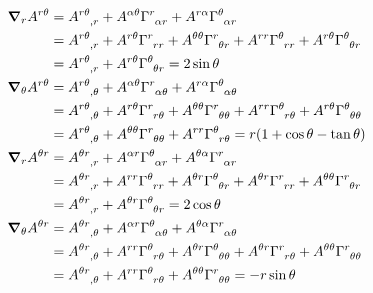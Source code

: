 \documentclass[gr-notes.tex]{subfiles}
\begin{document}
\begin{align*}
  \grad_r A^{r \theta} &=
  \tensor{A}{^{r \theta}_{,r}} +
  A^{\alpha \theta} \tensor{\Gamma}{^r_{\alpha r}} +
  A^{r \alpha} \tensor{\Gamma}{^\theta_{\alpha r}}
  \\ &=
  \tensor{A}{^{r \theta}_{,r}} +
  A^{r \theta} \tensor{\Gamma}{^r_{r r}} +
  A^{\theta \theta} \tensor{\Gamma}{^r_{\theta r}} +
  A^{r r} \tensor{\Gamma}{^\theta_{r r}} +
  A^{r \theta} \tensor{\Gamma}{^\theta_{\theta r}}
  \\ &=
  \tensor{A}{^{r \theta}_{,r}} +
  A^{r \theta} \tensor{\Gamma}{^\theta_{\theta r}} =
  2 \sin\theta
  \\
  \grad_\theta A^{r \theta} &=
  \tensor{A}{^{r \theta}_{,\theta}} +
  A^{\alpha \theta} \tensor{\Gamma}{^r_{\alpha \theta}} +
  A^{r \alpha} \tensor{\Gamma}{^\theta_{\alpha \theta}}
  \\ &=
  \tensor{A}{^{r \theta}_{,\theta}} +
  A^{r \theta} \tensor{\Gamma}{^r_{r \theta}} +
  A^{\theta \theta} \tensor{\Gamma}{^r_{\theta \theta}} +
  A^{r r} \tensor{\Gamma}{^\theta_{r \theta}} +
  A^{r \theta} \tensor{\Gamma}{^\theta_{\theta \theta}}
  \\ &=
  \tensor{A}{^{r \theta}_{,\theta}} +
  A^{\theta \theta} \tensor{\Gamma}{^r_{\theta \theta}} +
  A^{r r} \tensor{\Gamma}{^\theta_{r \theta}} =
  r (1 + \cos\theta - \tan\theta)
  \\
  \grad_r A^{\theta r} &=
  \tensor{A}{^{\theta r}_{,r}} +
  A^{\alpha r} \tensor{\Gamma}{^\theta_{\alpha r}} +
  A^{\theta \alpha} \tensor{\Gamma}{^r_{\alpha r}}
  \\ &=
  \tensor{A}{^{\theta r}_{,r}} +
  A^{r r} \tensor{\Gamma}{^\theta_{r r}} +
  A^{\theta r} \tensor{\Gamma}{^\theta_{\theta r}} +
  A^{\theta r} \tensor{\Gamma}{^r_{r r}} +
  A^{\theta \theta} \tensor{\Gamma}{^r_{\theta r}}
  \\ &=
  \tensor{A}{^{\theta r}_{,r}} +
  A^{\theta r} \tensor{\Gamma}{^\theta_{\theta r}} =
  2 \cos\theta
  \\
  \grad_\theta A^{\theta r} &=
  \tensor{A}{^{\theta r}_{,\theta}} +
  A^{\alpha r} \tensor{\Gamma}{^\theta_{\alpha \theta}} +
  A^{\theta \alpha} \tensor{\Gamma}{^r_{\alpha \theta}}
  \\ &=
  \tensor{A}{^{\theta r}_{,\theta}} +
  A^{r r} \tensor{\Gamma}{^\theta_{r \theta}} +
  A^{\theta r} \tensor{\Gamma}{^\theta_{\theta \theta}} +
  A^{\theta r} \tensor{\Gamma}{^r_{r \theta}} +
  A^{\theta \theta} \tensor{\Gamma}{^r_{\theta \theta}}
  \\ &=
  \tensor{A}{^{\theta r}_{,\theta}} +
  A^{r r} \tensor{\Gamma}{^\theta_{r \theta}} +
  A^{\theta \theta} \tensor{\Gamma}{^r_{\theta \theta}} =
  -r \sin\theta
\end{align*}
\end{document}

